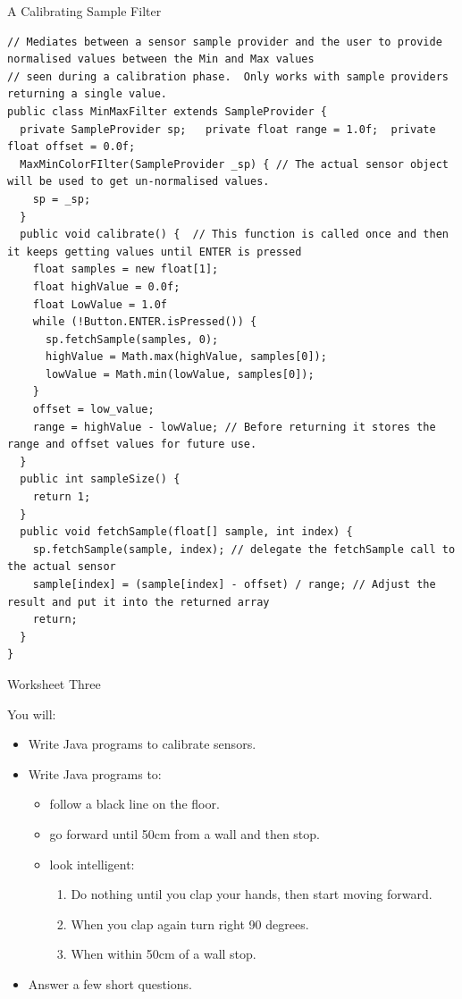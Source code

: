 \documentclass[color=pdftex,usenames,dvipsnames, aspectratio=169]{beamer}
\begin{document}
\begin{frame}[plain,label=lightBig,fragile]{A Calibrating Sample Filter}
\vspace*{-2mm}
\begin{lstlisting}[basicstyle=\ttfamily\tiny\color{blue}]
// Mediates between a sensor sample provider and the user to provide normalised values between the Min and Max values
// seen during a calibration phase.  Only works with sample providers returning a single value.
public class MinMaxFilter extends SampleProvider {
  private SampleProvider sp;   private float range = 1.0f;  private float offset = 0.0f;
  MaxMinColorFIlter(SampleProvider _sp) { // The actual sensor object will be used to get un-normalised values.
    sp = _sp;
  }
  public void calibrate() {  // This function is called once and then it keeps getting values until ENTER is pressed
    float samples = new float[1];
    float highValue = 0.0f;
    float LowValue = 1.0f
    while (!Button.ENTER.isPressed()) {
      sp.fetchSample(samples, 0);
      highValue = Math.max(highValue, samples[0]);
      lowValue = Math.min(lowValue, samples[0]);
    }
    offset = low_value;
    range = highValue - lowValue; // Before returning it stores the range and offset values for future use.
  }
  public int sampleSize() {
    return 1;
  }
  public void fetchSample(float[] sample, int index) {
    sp.fetchSample(sample, index); // delegate the fetchSample call to the actual sensor
    sample[index] = (sample[index] - offset) / range; // Adjust the result and put it into the returned array
    return;
  }
}
\end{lstlisting}
\end{frame}


\begin{frame}{Worksheet Three}
\begin{block}{You will:}
\begin{itemize}
\item Write Java programs to calibrate sensors.
\item Write Java programs to:
\begin{itemize}
 \item follow a black line on the floor.
 \item go forward until   50cm from a wall and then stop.
 \item look intelligent:
\begin{enumerate}
 \item  Do nothing until you clap your hands, then start moving forward.
 \item  When you clap again turn right 90 degrees.
 \item  When within 50cm of a wall stop.
\end{enumerate}
\end{itemize}
\item Answer a few short questions.
\end{itemize}
\end{block}
\end{frame}
\end{document}
